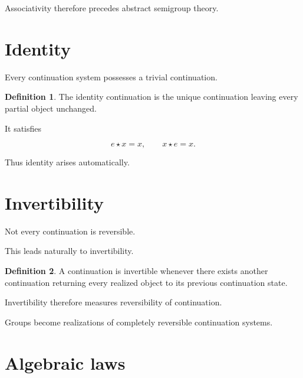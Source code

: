 \documentclass[13pt,openany]{book}
\theoremstyle{plain}
\theoremstyle{definition}
\newtheorem{definition}{Definition}[chapter]
\begin{document}
Associativity therefore precedes abstract semigroup theory.

\section{Identity}

Every continuation system possesses a trivial continuation.

\begin{definition}

The identity continuation is the unique continuation leaving every partial object unchanged.

\end{definition}

It satisfies

\[
e\star x=x,
\qquad
x\star e=x.
\]

Thus identity arises automatically.

\section{Invertibility}

Not every continuation is reversible.

This leads naturally to invertibility.

\begin{definition}

A continuation is invertible whenever there exists another continuation returning every realized object to its previous continuation state.

\end{definition}

Invertibility therefore measures reversibility of continuation.

Groups become realizations of completely reversible continuation systems.

\section{Algebraic laws}
\end{document}
